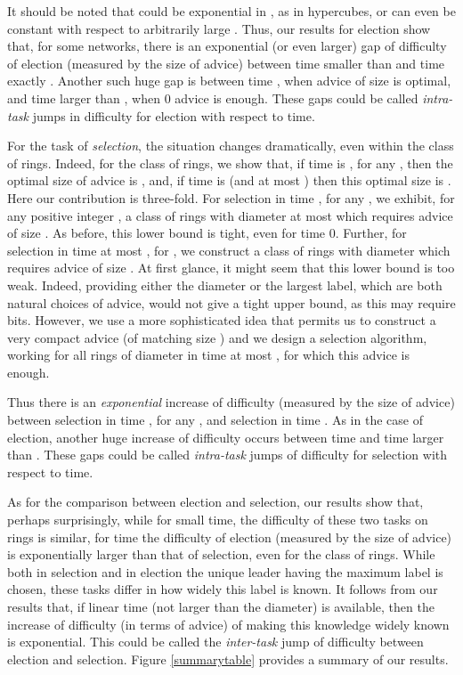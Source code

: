 \documentclass[11pt]{article}
\begin{document}
It should be noted that  could be exponential
in , as in hypercubes, or  can even be constant with respect to arbitrarily large  . Thus, our results for election show that, for some networks, there is an exponential (or even
larger) gap of difficulty of election (measured by the size of advice) between time smaller than  and time exactly . Another such huge gap is between time
, when advice of size  is optimal, and time larger than , when 0 advice is enough. These gaps could be called {\em intra-task}
jumps in difficulty for election with respect to time.  

 
 


For the task of {\em selection}, the situation changes dramatically,
even within the class of rings. Indeed, for the class of rings, we show that, if time is
, for any , then the optimal size of advice is , and, if time is  (and at most ) then
 this optimal size is . Here our contribution is three-fold. For selection in time , for any ,  we exhibit, for any
 positive integer , a class of rings with diameter at most  which requires advice of size . As before, this lower bound is tight, even for time 0.
Further, for selection in time at most , for , we construct a class of rings with diameter  which requires advice of size . At first glance, it might seem that this lower bound is too weak. Indeed, providing  either the diameter or the largest label, which are both natural choices of advice, would not give a tight upper bound, as this may require  bits. However, we use a more sophisticated idea that permits us to construct a very compact advice 
(of matching size ) and we design a selection algorithm,
working for all rings of diameter  in time at most , for which this advice is enough.   
 
 
 
 
 Thus there is an {\em exponential} increase of difficulty (measured by the size of advice) between selection in time , for any ,
and selection in time . As in the case of election, another huge increase of difficulty occurs between time  and time larger than .  These gaps could be called {\em intra-task} jumps of difficulty for selection with respect to time. 

 As for the comparison between election and selection, our results show that, perhaps surprisingly, while  for small time, the difficulty of these two tasks 
 on rings is similar, for time   the difficulty of election (measured by the size of advice) is exponentially larger than that of selection,
even for the class of rings.
 While both in selection and in election the unique leader having the maximum label is chosen, these tasks differ in how widely this label is known. It follows from our results that,
if linear time (not larger than the diameter) is available, then the increase of difficulty (in terms of advice) of making this knowledge widely known is exponential.
This could be called the {\em inter-task} jump of difficulty between election and selection.  Figure \ref{summarytable} provides a summary of our results.
\end{document}
